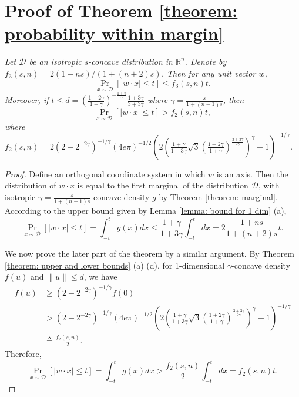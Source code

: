 \documentclass[11pt]{article}
\newcommand{\R}{\mathbb{R}}
\begin{document}
{{{{\section{Proof of Theorem \ref{theorem: probability within margin}}
\emph{Let $\mathcal{D}$ be an isotropic $s$-concave distribution in $\R^n$. Denote by $f_3(s,n)=2(1+ns)/(1+(n+2)s)$. Then for any unit vector $w$,
\begin{equation}
\Pr_{x\sim\mathcal{D}}[|w\cdot x|\le t]\le f_3(s,n)t.
\end{equation}
Moreover, if $t\le d=\left(\frac{1+2\gamma}{1+\gamma}\right)^{-\frac{1+\gamma}{\gamma}}\frac{1+3\gamma}{3+3\gamma}$ where $\gamma=\frac{s}{1+(n-1)s}$, then
\begin{equation}
\Pr_{x\sim\mathcal{D}}[|w\cdot x|\le t]> f_2(s,n)t,
\end{equation}
where $f_2(s,n)=2(2-2^{-2\gamma})^{-1/\gamma}(4e\pi)^{-1/2}\left(2\left(\frac{1+\gamma}{1+3\gamma}\sqrt{3}\left(\frac{1+2\gamma}{1+\gamma}\right)^{\frac{3+3\gamma}{2\gamma}}\right)^\gamma-1\right)^{-1/\gamma}$.}

\begin{proof}
Define an orthogonal coordinate system in which $w$ is an axis. Then the distribution of $w\cdot x$ is equal to the first marginal of the distribution $\mathcal{D}$, with isotropic $\gamma=\frac{s}{1+(n-1)s}$-concave density $g$ by Theorem \ref{theorem: marginal}. According to the upper bound given by Lemma \ref{lemma: bound for 1 dim} (a),
\begin{equation*}
\Pr_{x\sim\mathcal{D}}[|w\cdot x|\le t]=\int_{-t}^t g(x)dx\le \frac{1+\gamma}{1+3\gamma}\int_{-t}^t dx=2\frac{1+ns}{1+(n+2)s}t.
\end{equation*}

We now prove the later part of the theorem by a similar argument. By Theorem \ref{theorem: upper and lower bounds} (a) (d), for 1-dimensional $\gamma$-concave density $f(u)$ and $\|u\|\le d$, we have
\begin{equation*}
\begin{split}
f(u)&\ge (2-2^{-2\gamma})^{-1/\gamma}f(0)\\
&>(2-2^{-2\gamma})^{-1/\gamma}(4e\pi)^{-1/2}\left(2\left(\frac{1+\gamma}{1+3\gamma}\sqrt{3}\left(\frac{1+2\gamma}{1+\gamma}\right)^{\frac{3+3\gamma}{2\gamma}}\right)^\gamma-1\right)^{-1/\gamma}\\
&\triangleq \frac{f_2(s,n)}{2}.
\end{split}
\end{equation*}
Therefore,
\begin{equation*}
\Pr_{x\sim\mathcal{D}}[|w\cdot x|\le t]=\int_{-t}^t g(x)dx> \frac{f_2(s,n)}{2}\int_{-t}^t dx=f_2(s,n)t.
\end{equation*}
\end{proof}



}}}}
\end{document}
